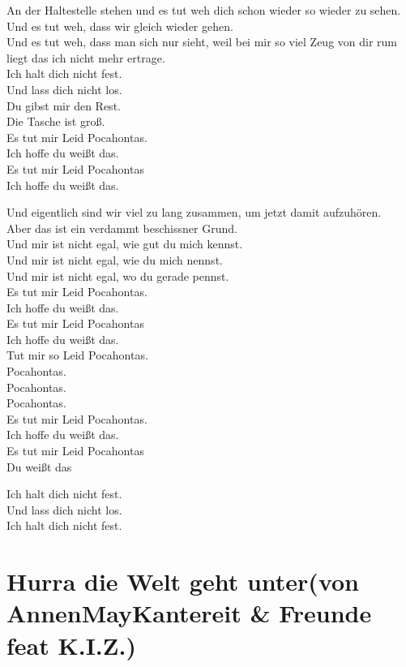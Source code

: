 \documentclass[]{book}
\begin{document}
An der Haltestelle stehen und es tut weh dich schon wieder so wieder zu sehen.\\
Und es tut weh, dass wir gleich wieder gehen.\\
Und es tut weh, dass man sich nur sieht, weil bei mir so viel Zeug von dir rum liegt das ich nicht mehr ertrage.\\
Ich halt dich nicht fest.\\
Und lass dich nicht los.\\
Du gibst mir den Rest.\\
Die Tasche ist groß.\\
Es tut mir Leid Pocahontas.\\
Ich hoffe du weißt das.\\
Es tut mir Leid Pocahontas\\
Ich hoffe du weißt das.

Und eigentlich sind wir viel zu lang zusammen, um jetzt damit aufzuhören.\\
Aber das ist ein verdammt beschissner Grund.\\
Und mir ist nicht egal, wie gut du mich kennst.\\
Und mir ist nicht egal, wie du mich nennst.\\
Und mir ist nicht egal, wo du gerade pennst.\\
Es tut mir Leid Pocahontas.\\
Ich hoffe du weißt das.\\
Es tut mir Leid Pocahontas\\
Ich hoffe du weißt das.\\
Tut mir so Leid Pocahontas.\\
Pocahontas.\\
Pocahontas.\\
Pocahontas.\\
Es tut mir Leid Pocahontas.\\
Ich hoffe du weißt das.\\
Es tut mir Leid Pocahontas\\
Du weißt das

Ich halt dich nicht fest.\\
Und lass dich nicht los.\\
Ich halt dich nicht fest.

\hypertarget{hurra-die-welt-geht-untervon-annenmaykantereit-freunde-feat-k.i.z.-1}{%
\section{Hurra die Welt geht unter(von AnnenMayKantereit \& Freunde feat K.I.Z.)}\label{hurra-die-welt-geht-untervon-annenmaykantereit-freunde-feat-k.i.z.-1}}
\end{document}

